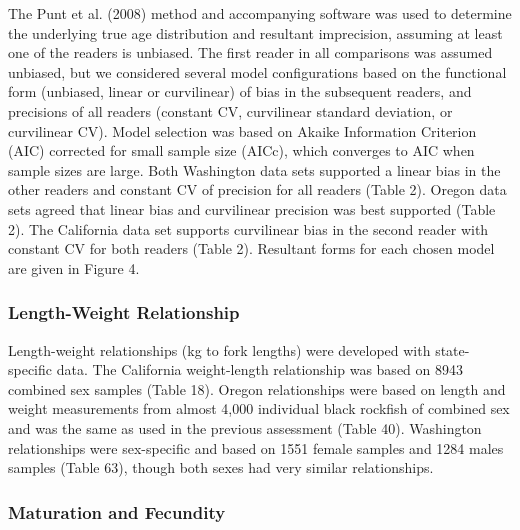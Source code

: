 \documentclass[11pt,
  english,
  letterpaper,
]{article}
\begin{document}
The Punt et al. (2008) method and accompanying software was used to determine the underlying true age distribution and resultant imprecision, assuming at least one of the readers is unbiased. The first reader in all comparisons was assumed unbiased, but we considered several model configurations based on the functional form (unbiased, linear or curvilinear) of bias in the subsequent readers, and precisions of all readers (constant CV, curvilinear standard deviation, or curvilinear CV). Model selection was based on Akaike Information Criterion (AIC) corrected for small sample size (AICc), which converges to AIC when sample sizes are large. Both Washington data sets supported a linear bias in the other readers and constant CV of precision for all readers (Table 2). Oregon data sets agreed that linear bias and curvilinear precision was best supported (Table 2). The California data set supports curvilinear bias in the second reader with constant CV for both readers (Table 2). Resultant forms for each chosen model are given in Figure 4.

\hypertarget{length-weight-relationship}{%
\subsubsection{Length-Weight Relationship}\label{length-weight-relationship}}

Length-weight relationships (kg to fork lengths) were developed with state-specific data. The California weight-length relationship was based on 8943 combined sex samples (Table 18). Oregon relationships were based on length and weight measurements from almost 4,000 individual black rockfish of combined sex and was the same as used in the previous assessment (Table 40). Washington relationships were sex-specific and based on 1551 female samples and 1284 males samples (Table 63), though both sexes had very similar relationships.

\hypertarget{maturation-and-fecundity}{%
\subsubsection{Maturation and Fecundity}\label{maturation-and-fecundity}}
\end{document}
